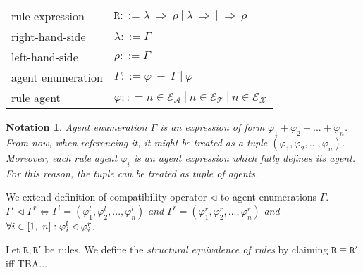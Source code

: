 \documentclass{entcs}
\renewcommand{\~}[0]{\texttildelow}
\newcommand{\choice}{|}
\newtheorem{notation}[thm]{Notation}
\begin{document}
\begin{center}
{\small
\hspace*{-1cm}\begin{tabular}{ l l }
 rule expression & $\mathtt{R} ::= \lambda ~\Rightarrow~ \rho ~|~ \lambda ~\Rightarrow ~|~ \Rightarrow~ \rho $\\
 right-hand-side & $\lambda ::= \Gamma$\\
 left-hand-side & $\rho ::= \Gamma$\\
 agent enumeration & $\Gamma ::= \varphi~ +~\Gamma ~|~ \varphi$\\
 rule agent & $\varphi :: = n \in \mathcal{E}_\mathcal{A}~\choice~n \in \mathcal{E}_\mathcal{T}~\choice~n \in \mathcal{E}_\mathcal{X}$\\
\end{tabular}
}
\end{center}

\begin{notation} \label{mynote}
Agent enumeration $\Gamma$ is an expression of form $\varphi_1 + \varphi_2 + ... + \varphi_n$. From now, when referencing it, it might be treated as a tuple $(\varphi_1, \varphi_2, ..., \varphi_n)$. Moreover, each rule agent $\varphi_i$ is an agent expression which fully defines its agent. For this reason, the tuple can be treated as tuple of agents. 
\end{notation} 

\begin{defn}
We extend definition of compatibility operator $\lhd$ to agent enumerations $\Gamma$. $\Gamma^{l} \lhd \Gamma^{r} \Leftrightarrow \Gamma^{l} = (\varphi^{l}_1, \varphi^{l}_2, ..., \varphi^{l}_n)$ \emph{and} $\Gamma^{r} = (\varphi^{r}_1, \varphi^{r}_2, ..., \varphi^{r}_n)$ \emph{and} $\\ \forall i \in [1,~n] : \varphi^{l}_i \lhd \varphi^{r}_i $.
\end{defn}

\begin{defn}
Let $\mathtt{R},\mathtt{R}'$ be rules. We define the \emph{structural equivalence of rules} by claiming $\mathtt{R} \equiv \mathtt{R}'$ iff TBA...
\end{defn}
\end{document}
